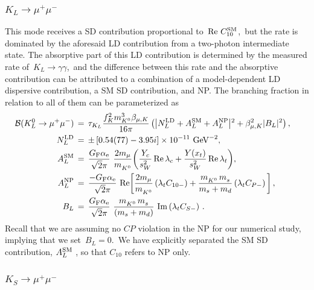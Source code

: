 \documentclass[amsmath,amssymb,aps,nofootinbib,prd,preprint,superscriptaddress,tightenlines,a4paper,bm]{revtex4-2}
\begin{document}
\subsubsection{\boldmath$K_L^{}\to\mu^+\mu^-$}   \vspace{-1em}

This mode receives a SD contribution proportional to \,${\rm Re}~C_{10}^{\rm SM}$,\, but the rate is dominated by the aforesaid LD contribution from a two-photon intermediate state.
The absorptive part of this LD contribution is determined by the measured rate of \,$K_L\to \gamma\gamma$,\, and the difference between this rate and the absorptive contribution can be attributed to a combination of a model-dependent LD dispersive contribution, a SM SD contribution, and NP.
The branching fraction in relation to all of them can be parameterized as  \cite{Chobanova:2017rkj,Neshatpour:2022fak}
\begin{align}
    \label{eq:brKLmumuComplete}
{\cal B}(K^0_{L} \to \mu^+ \mu^- ) & \,=\, \tau_{K_L}  \frac{ f_K^2 m_{K^0}^3 \beta_{\mu,K}} {16 \pi} \left(\big|N_L^{\rm LD}+A_L^{\rm SM}+A_L^{\rm NP} \big| {}^2+\beta_{\mu,K}^2|B_L|^2\right) , \nonumber \\
N_L^{\rm LD} & \,=\, \pm   \left[0.54(77) - 3.95 i\right]\times 10^{-11} {\rm~GeV}^{-2} , \nonumber \\
A_L^{\rm SM} & \,=\, \frac{G_{\rm F} \alpha_{\rm e}}{\sqrt{2}\pi}~ \frac{2m_\mu}{m_{K^0}^{}} \bigg(\frac{ Y_c}{s_W^2}\, {\rm Re}\,\lambda_c+\frac{Y(x_t)}{s_W^2}\, {\rm Re}\,\lambda_t \bigg) , \nonumber \\
A_L^{\rm NP} & \,=\, \frac{-G_{\rm F} \alpha_{\rm e} }{\sqrt{2}\pi} {\rm~Re} \bigg[ \frac{2m_\mu}{m_{K^0}^{}}\left(\lambda_tC_{10-}\right) + \frac{m_{K^0}^{}\, m_{s}^{}}{m_s +m_d} \left(\lambda_tC_{P-}\right) \bigg] \,,
\\ \nonumber
B_L & \,=\, \frac{G_{\rm F} \alpha_{\rm e}}{\sqrt{2}\pi}~ \frac{ m_{K^0}^{}\, m_{s}^{}}{(m_s +m_d)} {\rm~Im}\left(\lambda_tC_{S-}\right) \,. &
\end{align}
Recall that we are assuming no $CP$ violation in the NP for our numerical study, implying  that we set \,$B_L=0$.\,
We have explicitly separated the SM SD contribution,  $A_L^{\rm SM}$ \cite{Gorbahn:2006bm}, so that $C_{10}$ refers to NP only.

\subsubsection{\boldmath$K_S^{}\to\mu^+\mu^-$}   \vspace{-1em}
\end{document}
